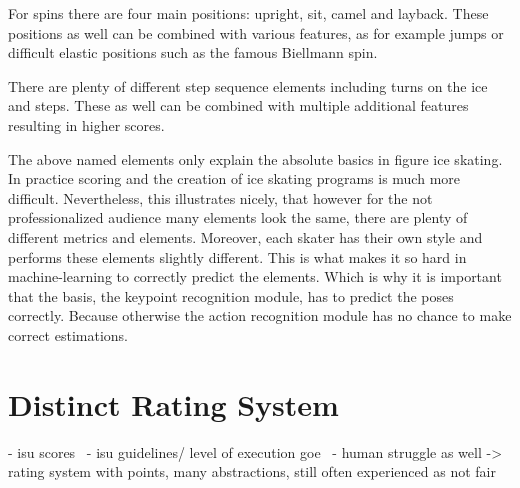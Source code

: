 \begin{flushleft}
    For spins there are four main positions: upright, sit, camel and layback.
    These positions as well can be combined with various features, as for example jumps or difficult elastic positions
    such as the famous Biellmann spin.
\end{flushleft}
\begin{flushleft}
    There are plenty of different step sequence elements including turns on the ice and steps.
    These as well can be combined with multiple additional features resulting in higher scores.

\end{flushleft}
\begin{flushleft}
    The above named elements only explain the absolute basics in figure ice skating.
    In practice scoring and the
    creation of ice skating
    programs is much more difficult.
    Nevertheless, this illustrates nicely, that however for the not professionalized
    audience many elements
    look the same, there are plenty of different metrics and elements.
    Moreover, each skater has their own style
    and performs these elements
    slightly different.
    This is what makes it so hard in machine-learning to correctly predict the elements.
    Which is
    why it is important that
    the basis, the keypoint recognition module, has to predict the poses correctly.
    Because otherwise the action
    recognition module has no
    chance to make correct estimations.
\end{flushleft}
%



\section{Distinct Rating System}
- isu scores~\cite{isuscores}
- isu guidelines/ level of execution goe~\cite{isuguideleinesgoe}
- human struggle as well -> rating system with points, many abstractions, still often experienced as not fair

